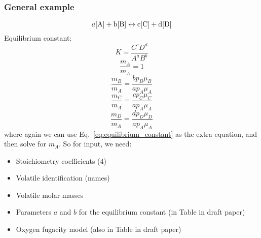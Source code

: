 \subsubsection{General example}
\begin{equation}
    a[\rm{A}] + b[\rm{B}] \leftrightarrow c[\rm{C}] + d[\rm{D}]
    \label{eq:reaction_general}
\end{equation}
Equilibrium constant:
\begin{equation}
K = \frac{C^c D^d}{A^a B^b}
\label{eq:equilibrium_constant}
\end{equation}
\begin{equation}
\frac{m_{A}}{m_{A}} = 1
\end{equation}
\begin{equation}
\frac{m_{B}}{m_{A}} = \frac{b p_{B} \mu_{B}}{a p_{A} \mu_{A} }
\end{equation}
\begin{equation}
\frac{m_{C}}{m_{A}} = \frac{c p_{C} \mu_{C}}{a p_{A} \mu_{A} }
\end{equation}
\begin{equation}
\frac{m_{D}}{m_{A}} = \frac{d p_{D} \mu_{D}}{a p_{A} \mu_{A} }
\end{equation}
where again we can use Eq.~\ref{eq:equilibrium_constant} as the extra equation, and then solve for $m_A$.  So for input, we need:
\begin{itemize}
\item Stoichiometry coefficients (4)
\item Volatile identification (names)
\item Volatile molar masses
\item Parameters $a$ and $b$ for the equilibrium constant (in Table in draft paper)
\item Oxygen fugacity model (also in Table in draft paper)
\end{itemize}
